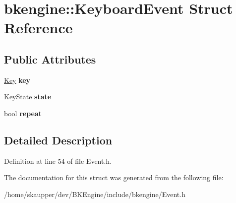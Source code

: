 \hypertarget{structbkengine_1_1KeyboardEvent}{}\section{bkengine\+:\+:Keyboard\+Event Struct Reference}
\label{structbkengine_1_1KeyboardEvent}
\subsection*{Public Attributes}
\begin{DoxyCompactItemize}
\item 
\mbox{\label{structbkengine_1_1KeyboardEvent_a7512cfbc91f52c63277afc29883f0784}} 
\hyperlink{classbkengine_1_1Key}{Key} {\bfseries key}
\item 
\mbox{\label{structbkengine_1_1KeyboardEvent_ae1ef646e201c5bb43506af57b96d104b}} 
Key\+State {\bfseries state}
\item 
\mbox{\label{structbkengine_1_1KeyboardEvent_a7a4e85fd8ad152558feaa9405264a14a}} 
bool {\bfseries repeat}
\end{DoxyCompactItemize}


\subsection{Detailed Description}


Definition at line 54 of file Event.\+h.



The documentation for this struct was generated from the following file\+:\begin{DoxyCompactItemize}
\item 
/home/skaupper/dev/\+B\+K\+Engine/include/bkengine/Event.\+h\end{DoxyCompactItemize}
